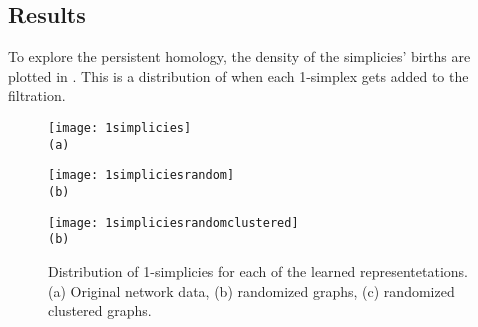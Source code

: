 \documentclass[letter,10pt,openany]{article}
\begin{document}
\subsection{Results}

To explore the persistent homology, the density
of the simplicies' births are plotted in . This is a distribution
of when each 1-simplex gets added to the filtration.
\begin{figure}[H]
\begin{minipage}[height=.5\textheight]{.48\textwidth}
\centering
\texttt{[image: 1simplicies]}
\\ \small{\texttt{(a)}}
\end{minipage}
\begin{minipage}[height=.5\textheight]{.48\textwidth}
\centering
\texttt{[image: 1simpliciesrandom]}
\\ \small{\texttt{(b)}}
\end{minipage}
\centering
\begin{minipage}[height=.5\textheight]{.48\textwidth}
\centering
\texttt{[image: 1simpliciesrandomclustered]}
\\ \small{\texttt{(b)}}
\end{minipage}
\caption{\label{simplices}
Distribution of 1-simplicies for each of the learned representetations.
(a) Original network data, (b) randomized graphs, (c) randomized clustered
graphs.
}
\end{figure}
\end{document}
